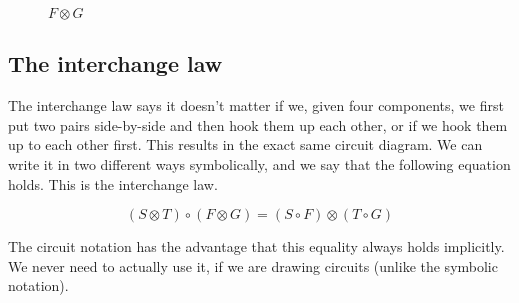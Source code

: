 \documentclass[runningheads]{llncs}
\begin{document}
\begin{figure}[H]
  \centering
\begin{minipage}{.5\textwidth}
    \centering
{}
\end{minipage}
  \caption{$F \otimes G$}
\end{figure}

\subsection{The interchange law}

The interchange law says it doesn't matter if we, given four components, we first put two pairs side-by-side and then
hook them up each other, or if we hook them up to each other first. This results in the exact same circuit diagram. We can
write it in two different ways symbolically, and we say that the following equation holds. This is the interchange law.

\[
  (S \otimes T) \circ (F \otimes G) = (S \circ F) \otimes (T \circ G)
\]

The circuit notation has the advantage that this equality always holds implicitly. We never need to actually use it, if we are
drawing circuits (unlike the symbolic notation).
\end{document}
